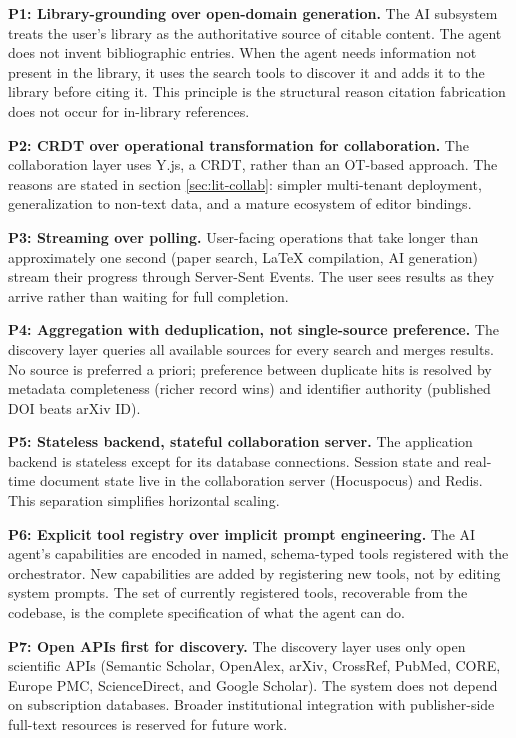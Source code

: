 \textbf{P1: Library-grounding over open-domain generation.} The AI subsystem treats the user's library as the authoritative source of citable content. The agent does not invent bibliographic entries. When the agent needs information not present in the library, it uses the search tools to discover it and adds it to the library before citing it. This principle is the structural reason citation fabrication does not occur for in-library references.

\textbf{P2: CRDT over operational transformation for collaboration.} The collaboration layer uses Y.js, a CRDT, rather than an OT-based approach. The reasons are stated in section \ref{sec:lit-collab}: simpler multi-tenant deployment, generalization to non-text data, and a mature ecosystem of editor bindings.

\textbf{P3: Streaming over polling.} User-facing operations that take longer than approximately one second (paper search, LaTeX compilation, AI generation) stream their progress through Server-Sent Events. The user sees results as they arrive rather than waiting for full completion.

\textbf{P4: Aggregation with deduplication, not single-source preference.} The discovery layer queries all available sources for every search and merges results. No source is preferred a priori; preference between duplicate hits is resolved by metadata completeness (richer record wins) and identifier authority (published DOI beats arXiv ID).

\textbf{P5: Stateless backend, stateful collaboration server.} The application backend is stateless except for its database connections. Session state and real-time document state live in the collaboration server (Hocuspocus) and Redis. This separation simplifies horizontal scaling.

\textbf{P6: Explicit tool registry over implicit prompt engineering.} The AI agent's capabilities are encoded in named, schema-typed tools registered with the orchestrator. New capabilities are added by registering new tools, not by editing system prompts. The set of currently registered tools, recoverable from the codebase, is the complete specification of what the agent can do.

\textbf{P7: Open APIs first for discovery.} The discovery layer uses only open scientific APIs (Semantic Scholar, OpenAlex, arXiv, CrossRef, PubMed, CORE, Europe PMC, ScienceDirect, and Google Scholar). The system does not depend on subscription databases. Broader institutional integration with publisher-side full-text resources is reserved for future work.

